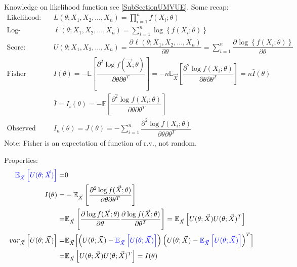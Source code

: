 Knowledge on likelihood function see \autoref{SubSectionUMVUE}. Some recap:
\begin{align}
    \text{Likelihood: }&L(\theta ;X_1,X_2,\ldots,X_n)=\prod_{i=1}^nf(X_i;\theta )\\
    \text{Log-Likelihood: }&\ell(\theta ;X_1,X_2,\ldots ,X_n)=\sum_{i=1}^n\log \left\{ f(X_i;\theta ) \right\}\\
    \text{Score: }&U(\theta ;X_1,X_2,\ldots ,X_n)=\dfrac{\partial^{} \ell(\theta ;X_1,X_2,\ldots ,X_n)}{\partial \theta ^{}}=\sum_{i=1}^n\dfrac{\partial^{} \log \left\{ f(X_i;\theta ) \right\}}{\partial \theta ^{}}\\
    \text{Fisher Information: }&I(\theta )=-\mathbb{E}\left[ \dfrac{\partial^{2} \log f(\vec{X};\theta )}{\partial \theta \partial \theta ^T} \right]=-n\mathbb{E}_{\vec{X}}\left[ \dfrac{\partial^{2} \log f(X_i;\theta )}{\partial \theta \partial \theta ^T} \right]=n\bar{I}(\theta )\\
    &\bar{I}=I_i(\theta )=-\mathbb{E}\left[ \dfrac{\partial^{2} \log f(X_i;\theta )}{\partial \theta \partial \theta ^T} \right]\\
    \text{Observed Information: }&I_n(\theta )=J(\theta )=-\sum_{i=1}^n\dfrac{\partial^{2} \log f(X_i;\theta )}{\partial \theta \partial \theta ^T}
\end{align}
    Note: Fisher is an expectation of function of r.v., not random.

Properties:
\begin{align}
    {\color{blue}\mathbb{E}_{\vec{X}}\left[ U(\theta ;\vec{X}) \right]}=&0\\
    I(\theta )=&-\mathbb{E}_{\vec{X}}\left[ \dfrac{\partial^{2} \log f(\vec{X};\theta )}{\partial \theta \partial \theta ^T} \right]\\
    =&\mathbb{E}_{\vec{X}}\left[\dfrac{\partial^{} \log f(\vec{X};\theta )}{\partial \theta ^{}}\dfrac{\partial^{} \log f(\vec{X};\theta )}{\partial \theta ^{T}}\right]=\mathbb{E}_{\vec{X}}\left[ U(\theta ;\vec{X})U(\theta ;\vec{X})^T \right]\\
    var_{\vec{X}}\left[ U(\theta ;\vec{X}) \right]=&\mathbb{E}_{\vec{X}}\Bigl[ \left(U(\theta;\vec{X})- {\color{blue}\mathbb{E}_{\vec{X}}\left[ U(\theta ;\vec{X}) \right]} \right)\left(U(\theta;\vec{X})- {\color{blue}\mathbb{E}_{\vec{X}}\left[ U(\theta ;\vec{X}) \right]} \right)^T \Bigr]\\
    =&\mathbb{E}_{\vec{X}}\left[ U(\theta ;\vec{X})U(\theta ;\vec{X})^T \right]=I(\theta )\\
\end{align}

